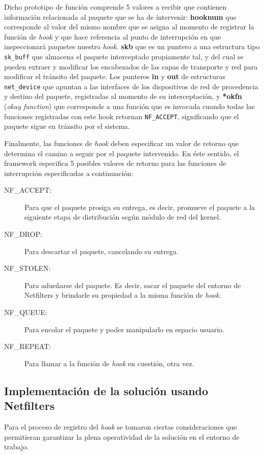 Dicho prototipo de función comprende 5 valores a recibir que contienen información relacionada al paquete que se ha de intervenir: \textbf{hooknum} que corresponde al valor del mismo nombre que se asigna al momento de registrar la función de \emph{hook} y que hace referencia al punto de interrupción en que inspeccionará paquetes nuestro \emph{hook}. \textbf{skb} que es un puntero a una estructura tipo \verb=sk_buff= que almacena el paquete interceptado propiamente tal, y del cual se pueden extraer y modificar los encabezados de las capas de transporte y red para modificar el tránsito del paquete. Los punteros \textbf{in} y \textbf{out} de estructuras \verb=net_device= que apuntan a las interfaces de los dispositivos de red de procedencia y destino del paquete, registradas al momento de su interceptación, y \textbf{*okfn} (\emph{okay function}) que corresponde a una función que es invocada cuando todas las funciones registradas con este hook retornan \verb=NF_ACCEPT=, significando que el paquete sigue en tránsito por el sistema.

Finalmente, las funciones de \emph{hook} deben especificar un valor de retorno que determina el camino a seguir por el paquete intervenido. En éste sentido, el framework especifica 5 posibles valores de retorno para las funciones de interrupción especificadas a continuación:
\begin{description}
\item[NF\_ACCEPT:] Para que el paquete prosiga su entrega, es decir, promueve el paquete a la siguiente etapa de distribución según módulo de red del kernel.
\item[NF\_DROP:] Para descartar el paquete, cancelando su entrega.
\item[NF\_STOLEN:] Para adueñarse del paquete. Es decir, sacar el paquete del entorno de Netfilters y brindarle su propiedad a la misma función de \emph{hook}.
\item[NF\_QUEUE:] Para encolar el paquete y poder manipularlo en espacio usuario.
\item[NF\_REPEAT:] Para llamar a la función de \emph{hook} en cuestión, otra vez.
\end{description}

\subsection{Implementación de la solución usando Netfilters}
Para el proceso de registro del \emph{hook} se tomaron ciertas consideraciones que permitieran garantizar la plena operatividad de la solución en el entorno de trabajo.


